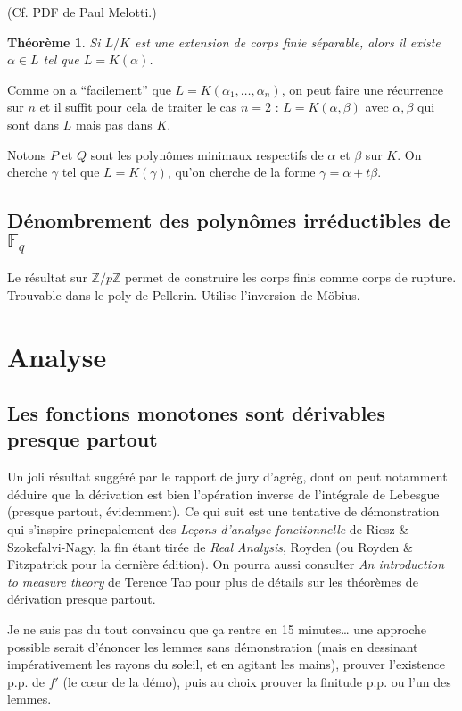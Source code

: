 \documentclass[a4paper, 11pt]{article}
\def\F{\mathbb{F}}
\def\Z{\mathbb{Z}}
\newtheorem*{theorem}{Théorème}
\begin{document}
(Cf. PDF de Paul Melotti.)

\begin{theorem}
  Si $L/K$ est une extension de corps finie séparable, alors il existe $\alpha
  \in L$ tel que $L = K(\alpha)$.
\end{theorem}

Comme on a \enquote{facilement} que $L = K(\alpha_1, \ldots, \alpha_n)$, on peut
faire une récurrence sur $n$ et il suffit pour cela de traiter le cas $n = 2$ :
$L = K(\alpha,\beta)$ avec $\alpha, \beta$ qui sont dans $L$ mais pas dans $K$.

Notons $P$ et $Q$ sont les polynômes minimaux respectifs de $\alpha$ et $\beta$
sur $K$. On cherche $\gamma$ tel que $L = K(\gamma)$, qu'on cherche de la forme
$\gamma = \alpha + t\beta$. 


\subsection{Dénombrement des polynômes irréductibles de $\F_q$}

Le résultat sur $\Z/p\Z$ permet de construire les corps finis comme corps de
rupture. Trouvable dans le poly de Pellerin. Utilise l'inversion de Möbius.

\section{Analyse}

\subsection{Les fonctions monotones sont dérivables presque partout}

Un joli résultat suggéré par le rapport de jury d'agrég, dont on peut notamment
déduire que la dérivation est bien l'opération inverse de l'intégrale de
Lebesgue (presque partout, évidemment). Ce qui suit est une tentative de
démonstration qui s'inspire princpalement des \emph{Leçons d'analyse
  fonctionnelle} de Riesz \& Szokefalvi-Nagy, la fin étant tirée de \emph{Real
  Analysis}, Royden (ou Royden \& Fitzpatrick pour la dernière édition). On
pourra aussi consulter \emph{An introduction to measure theory} de Terence Tao
pour plus de détails sur les théorèmes de dérivation presque partout.

Je ne suis pas du tout convaincu que ça rentre en 15 minutes… une approche
possible serait d'énoncer les lemmes sans démonstration (mais en dessinant
impérativement les rayons du soleil, et en agitant les mains), prouver
l'existence p.p. de $f'$ (le cœur de la démo), puis au choix prouver la finitude
p.p. ou l'un des lemmes.
\end{document}

